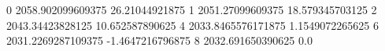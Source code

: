 0 2058.902099609375 26.21044921875
1 2051.27099609375 18.579345703125
2 2043.34423828125 10.652587890625
4 2033.8465576171875 1.1549072265625
6 2031.2269287109375 -1.4647216796875
8 2032.691650390625 0.0
